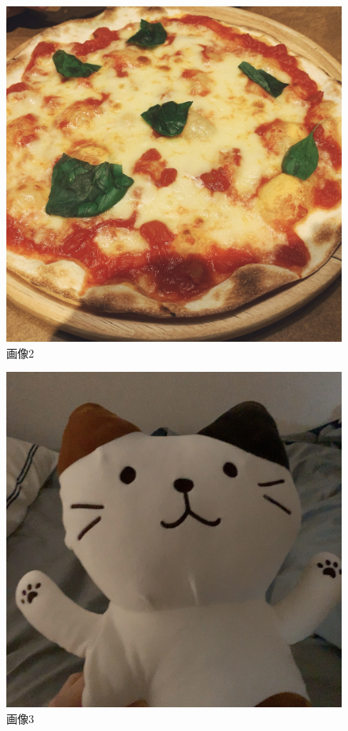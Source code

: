 \documentclass[12pt]{jarticle}
\begin{document}
\clearpage

\begin{figure}[h]
    \begin{center}
        \includegraphics[scale=0.1]{kadai4_3_2.jpg}
    \end{center}
    \caption{画像2}
\end{figure}
\begin{figure}[h]
    \begin{center}
        \includegraphics[scale=0.2]{kadai4_3_3.jpg}
    \end{center}
    \caption{画像3}
\end{figure}
\end{document}
